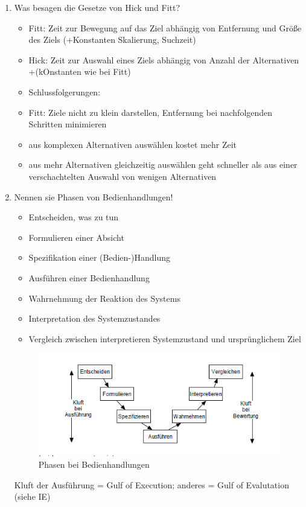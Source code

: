 \begin{enumerate}
	\item Was besagen die Gesetze von Hick und Fitt?
	\begin{itemize}
		\item Fitt: Zeit zur Bewegung auf das Ziel abhängig von Entfernung und Größe des Ziels (+Konstanten Skalierung, Suchzeit)
		\item Hick: Zeit zur Auswahl eines Ziels abhängig von Anzahl der Alternativen +(kOnstanten wie bei Fitt)
		\item Schlussfolgerungen:
		\item Fitt: Ziele nicht zu klein darstellen, Entfernung bei nachfolgenden Schritten minimieren
		\item aus komplexen Alternativen auswählen kostet mehr Zeit
		\item aus mehr Alternativen gleichzeitig auswählen geht schneller als aus einer verschachtelten Auswahl von wenigen Alternativen
	\end{itemize}
	
	\item Nennen sie Phasen von Bedienhandlungen!
	\begin{itemize}
		\item Entscheiden, was zu tun
		\item Formulieren einer Absicht
		\item Spezifikation einer (Bedien-)Handlung
		\item Ausführen einer Bedienhandlung
		\item Wahrnehmung der Reaktion des Systems
		\item Interpretation des Systemzustandes
		\item Vergleich zwischen interpretieren Systemzustand und ursprünglichem Ziel
	\end{itemize}
	\begin{figure}[!h]
		\centering
		\includegraphics[scale=0.5]{img/phasing.png}
		\caption{Phasen bei Bedienhandlungen}
	\end{figure}
	Kluft der Ausführung = Gulf of Execution; anderes = Gulf of Evalutation (siehe IE)
	

\end{enumerate}
